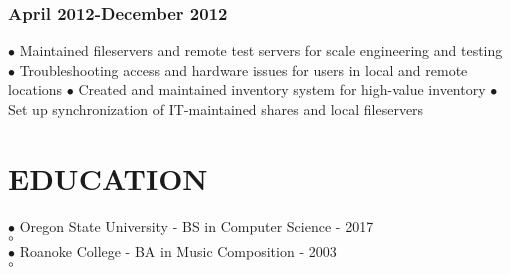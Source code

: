\documentclass{article}
\begin{document}
\subsubsection*{April 2012-December 2012}

$\bullet$ Maintained fileservers and remote test servers for scale engineering and testing
$\bullet$ Troubleshooting access and hardware issues for users in local and remote locations
$\bullet$ Created and maintained inventory system for high-value inventory
$\bullet$ Set up synchronization of IT-maintained shares and local fileservers

\section*{EDUCATION}

$\bullet$ Oregon State University - BS in Computer Science - 2017\\
$  \circ$ \\
$\bullet$ Roanoke College - BA in Music Composition - 2003\\
$  \circ$ \\
\end{document}
